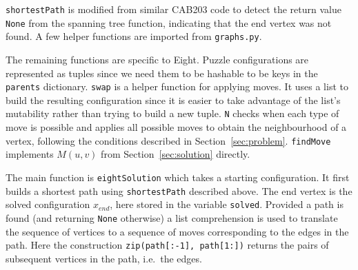 \documentclass[a4paper]{article}
\begin{document}
\verb+shortestPath+ is modified from similar CAB203 code to detect the return value \verb+None+ from the spanning tree function, indicating that the end vertex was not found.  A few helper functions are imported from \verb+graphs.py+.

The remaining functions are specific to Eight.  Puzzle configurations are represented as tuples since we need them to be hashable to be keys in the \verb+parents+ dictionary.  \verb+swap+ is a helper function for applying moves.  It uses a list to build the resulting configuration since it is easier to take advantage of the list's mutability rather than trying to build a new tuple.  \verb+N+ checks when each type of move is possible and applies all possible moves to obtain the neighbourhood of a vertex, following the conditions described in Section~\ref{sec:problem}.  \verb+findMove+ implements $M(u,v)$ from Section~\ref{sec:solution} directly.

The main function is \verb+eightSolution+ which takes a starting configuration.  It first builds a shortest path using \verb+shortestPath+ described above.  The end vertex is the solved configuration $x_{end}$, here stored in the variable \verb+solved+.  Provided a path is found (and returning \verb+None+ otherwise) a list comprehension is used to translate the sequence of vertices to a sequence of moves corresponding to the edges in the path.  Here the construction \verb+zip(path[:-1], path[1:])+ returns the pairs of subsequent vertices in the path, i.e.\ the edges.
\end{document}

